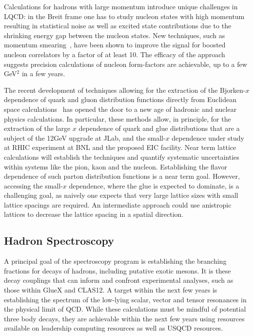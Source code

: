 Calculations for hadrons with large momentum introduce unique challenges in LQCD: in the Breit frame one 
has to study nucleon states with high momentum 
resulting in statistical noise as well as excited state contributions due to the
shrinking energy gap between the nucleon states.
New techniques, such as momentum smearing~\cite{Bali:2016lva,Syritsyn:2017jrc}, have been shown to improve
the signal for boosted nucleon correlators by a factor of at least 10. The efficacy of the approach suggests precision calculations of nucleon form-factors are achievable, up to a few GeV$^2$ in a few years.


The recent development of techniques allowing for the extraction of the Bjorken-$x$ dependence of quark and gluon distribution functions directly from Euclidean space calculations~\cite{Ji:2001wha} has opened the door to a new age of hadronic and nuclear physics calculations. In particular, these methods allow, in principle, for the extraction of the large $x$ dependence of quark and glue distributions that are a subject of the 12GeV upgrade at JLab, and the small-$x$ dependence under study at RHIC experiment at BNL and the proposed EIC facility. Near term  lattice calculations will establish the techniques and quantify systematic uncertainties within systems like the pion, kaon and the nucleon. Establishing the flavor dependence of such parton distribution functions is a near term goal. However, accessing the small-$x$ dependence, where the glue is expected to dominate, is a challenging goal, as naively one expects that very large lattice sizes with small lattice spacings are required. An intermediate approach could use anistropic lattices to decrease the lattice spacing in a spatial direction.%



\subsection{Hadron Spectroscopy}

A principal goal of the spectroscopy program is establishing the branching fractions for decays of hadrons, including putative exotic mesons. It is these decay couplings that can inform and confront experimental analyses, such as those within GlueX and CLAS12. A target within the next few years is establishing the spectrum of the low-lying scalar, vector and tensor resonances in the physical limit of QCD. While these calculations must be mindful of potential three body decays, they are achievable within the next few years using resources available on leadership computing resources as well as USQCD resources.


